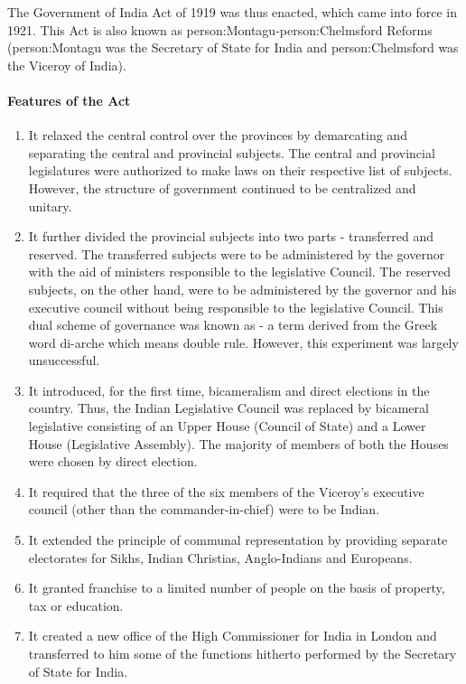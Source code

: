 The Government of India Act of 1919 was thus enacted, which came into force in 1921. This Act is also known as \gls{person:Montagu}-\gls{person:Chelmsford} Reforms (\gls{person:Montagu} was the Secretary of State for India and \gls{person:Chelmsford} was the Viceroy of India).

\paragraph{Features of the Act}
\begin{enumerate}
  \item It relaxed the central control over the provinces by demarcating and separating the central and provincial subjects. The central and provincial legislatures were authorized to make laws on their respective list of subjects. However, the structure of government continued to be
  centralized and unitary.
  \item It further divided the provincial subjects into two parts - transferred and reserved. The transferred subjects were to be administered by the governor with the aid of ministers responsible to the legislative Council. The reserved subjects, on the other hand, were to be administered by the governor and his executive council without being responsible to the legislative Council. This dual scheme of governance was known as
    - a term derived from the Greek word di-arche which means double rule. However, this experiment was largely unsuccessful.
  \item It introduced, for the first time, bicameralism and direct elections in the country. Thus, the Indian Legislative Council was replaced by bicameral legislative consisting of an Upper House (Council of State) and a Lower House (Legislative Assembly). The majority of members of both the Houses were chosen by direct election.
  \item It required that the three of the six members of the Viceroy's executive council (other than the commander-in-chief) were to be Indian.
  \item It extended the principle of communal representation by providing separate electorates for Sikhs, Indian Christias, Anglo-Indians and Europeans.
  \item It granted franchise to a limited number of people on the basis of property, tax or education.
  \item It created a new office of the High Commissioner for India in London and transferred to him some of the functions hitherto performed by the Secretary of State for India.

\end{enumerate}
